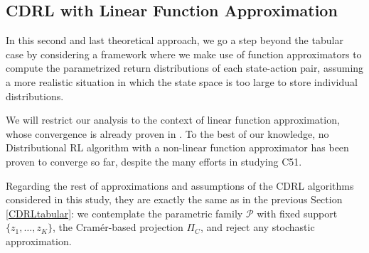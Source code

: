 \documentclass[12pt,a4paper,openright,twoside]{article}
\DeclareMathOperator*{\T}{\mathcal{T}}
\numberwithin{equation}{section}
\theoremstyle{definition}
\theoremstyle{remark}
\theoremstyle{plain}
\begin{document}

\subsection{CDRL with Linear Function Approximation}

In this second and last theoretical approach, we go a step beyond the tabular case by considering a framework where we make use of function approximators to compute the parametrized return distributions of each state-action pair, assuming a more realistic situation in which the state space is too large to store individual distributions.

We will restrict our analysis to the context of linear function approximation, whose convergence is already proven in \cite{DRLlinear}. To the best of our knowledge, no Distributional RL algorithm with a non-linear function approximator has been proven to converge so far, despite the many efforts in studying C51.

Regarding the rest of approximations and assumptions of the CDRL algorithms considered in this study, they are exactly the same as in the previous Section \ref{CDRLtabular}: we contemplate the parametric family $\mathcal{P}$ with fixed support $\{z_1, \dots, z_K\}$, the Cramér-based projection $\Pi_C$, and reject any stochastic approximation.
\end{document}
